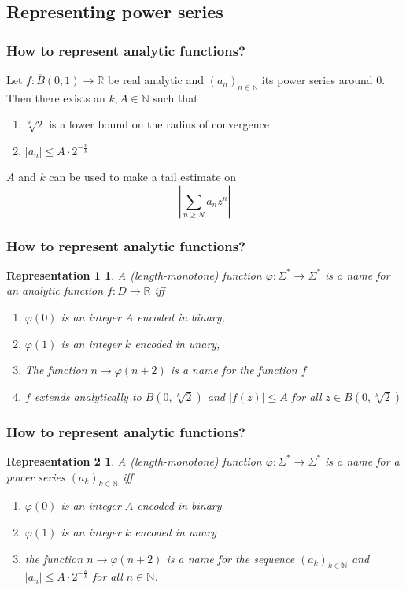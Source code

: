 \documentclass[xcolor=pdftex,dvipsnames,table,handout]{beamer}
\newcommand{\N}{\ensuremath{\mathbb{N}}}
\newcommand{\R}{\ensuremath{\mathbb{R}}}
\newcommand{\abs}[1]{\left|#1\right|}
\newtheorem{representation1}{Representation 1}
\newtheorem{representation2}{Representation 2}
\begin{document}
\subsection{Representing power series}
\begin{frame}
\frametitle{How to represent analytic functions?}
\begin{lemma}
  Let $f : \overline B(0,1) \to \R$ be real analytic and $(a_n)_{n \in \N}$ its power series around $0$.\\
  Then there exists an $k,A \in \N$ such that 
  \begin{enumerate}
  \item $\sqrt[k]{2}$ is a lower bound on the radius of convergence
  \item $\abs{a_n} \leq A \cdot 2^{-\frac{n}{k}}$
  \end{enumerate}
\end{lemma}
\pause
$A$ and $k$ can be used to make a tail estimate on
$$ \left | \sum_{n \geq N} a_n z^n \right |  $$
\end{frame}
\begin{frame}
\frametitle{How to represent analytic functions?}
\begin{representation1}
  A (length-monotone) function $\varphi: \Sigma^* \to \Sigma^*$ is a name for an analytic function $f:D \to \R$ iff
  \begin{enumerate}
  \item $\varphi(0)$ is an integer $A$ encoded in binary,
  \item $\varphi(1)$ is an integer $k$ encoded in unary,
  \item The function $n \to \varphi(n+2)$ is a name for the function $f$
  \item $f$ extends analytically to $B(0, \sqrt[k]{2})$ and $\abs{f(z)} \leq A$ for all $z \in B(0, \sqrt[k]{2})$
  \end{enumerate}

\end{representation1}
\end{frame}
\begin{frame}
\frametitle{How to represent analytic functions?}
\begin{representation2}
  A (length-monotone) function $\varphi: \Sigma^* \to \Sigma^*$ is a name for a power series $(a_k)_{k \in \N}$ iff
  \begin{enumerate}
  \item $\varphi(0)$ is an integer $A$ encoded in binary
  \item $\varphi(1)$ is an integer $k$ encoded in unary
  \item the function $n \to \varphi(n+2)$ is a name for the sequence $(a_k)_{k \in \N}$ and
  $\abs{a_n} \leq A \cdot 2^{-\frac{n}{k}}$ for all $n \in \N$.
  \end{enumerate}
\end{representation2}
\end{frame}
\end{document}
